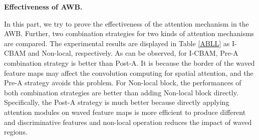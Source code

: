 \documentclass[journal]{IEEEtran}
\begin{document}
\textbf{Effectiveness of AWB.}\par 
In this part, we try to prove the effectiveness of the attention mechanism in the AWB. Further, two combination strategies for two kinds of attention mechanisms are compared. The experimental results are displayed in Table \ref{ABLL} as I-CBAM and Non-local, respectively. As can be observed, for I-CBAM, Pre-A combination strategy is better than Post-A. It is because the border of the waved feature maps may affect the convolution computing for spatial attention, and the Pre-A strategy avoids this problem. For Non-local block, the performances of both combination strategies are better than adding Non-local block directly. Specifically, the Post-A strategy is much better because directly applying attention modules on waved feature maps is more efficient to produce different and discriminative features and non-local operation reduces the impact of waved regions.










 



























\begin{table*}
\setlength{\abovecaptionskip}{0.3cm}
\setlength{\belowcaptionskip}{0.15cm}
\footnotesize
\centering
\caption{The average differences of two networks in Frobenius norm. ``Baseline" denotes single network,  i.e.  \ the difference is $0$. ``Attention" or ``WaveBlock" denotes only attention mechanism or WaveBlock is used. ``WaveBlock-S" denotes the same $X$ is generated for the two networks. ``AWB" denotes the combination of attention mechanism and WaveBlock.} 
\label{ABL-5}
\end{table*}
\end{document}

